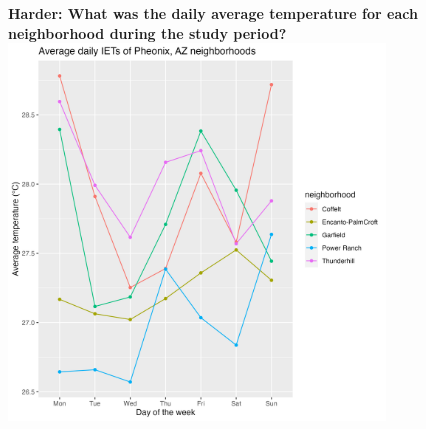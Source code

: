 \documentclass[
  letterpaper,
  DIV=11,
  numbers=noendperiod]{scrreprt}
\begin{document}
\begin{tcolorbox}
\textbf{Harder: What was the daily average temperature for each
neighborhood during the study period?}
\includegraphics[width=0.75\textwidth,height=\textheight]{scripts/04_projects/project-day-2_files/figs/temps-hard.png}

\end{tcolorbox}
\end{document}
